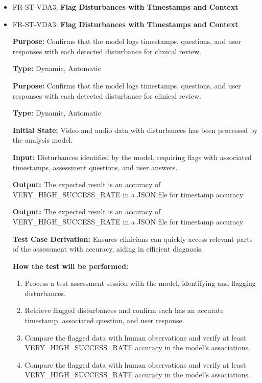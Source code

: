 \documentclass[12pt, titlepage]{article}
\begin{document}
\begin{itemize}
  \item FR-ST-VDA3: \textbf{Flag Disturbances with Timestamps and Context}
  \item FR-ST-VDA3: \textbf{Flag Disturbances with Timestamps and Context}
  \begin{mdframed}[linewidth=0.5mm]
      \textbf{Purpose:} Confirms that the model logs timestamps, questions, and user responses with each detected disturbance for clinical review. \par
      \textbf{Type:} Dynamic, Automatic \par
      \textbf{Purpose:} Confirms that the model logs timestamps, questions, and user responses with each detected disturbance for clinical review. \par
      \textbf{Type:} Dynamic, Automatic \par
      \textbf{Initial State:} Video and audio data with disturbances has been processed by the analysis model. \par
      \textbf{Input:} Disturbances identified by the model, requiring flags with associated timestamps, assessment questions, and user answers. \par
      \textbf{Output:} The expected result is an accuracy of VERY\_HIGH\_SUCCESS\_RATE in a JSON file for timestamp accuracy \par
      \textbf{Output:} The expected result is an accuracy of VERY\_HIGH\_SUCCESS\_RATE in a JSON file for timestamp accuracy \par
      \textbf{Test Case Derivation:} Ensures clinicians can quickly access relevant parts of the assessment with accuracy, aiding in efficient diagnosis. \par
      \textbf{How the test will be performed:}
      \begin{enumerate}[noitemsep]
        \item Process a test assessment session with the model, identifying and flagging disturbances.
        \item Retrieve flagged disturbances and confirm each has an accurate timestamp, associated question, and user response.
        \item Compare the flagged data with human observations and verify at least \\ VERY\_HIGH\_SUCCESS\_RATE accuracy in the model’s associations.
        \item Compare the flagged data with human observations and verify at least \\ VERY\_HIGH\_SUCCESS\_RATE accuracy in the model’s associations.
      \end{enumerate}
  \end{mdframed}
\end{itemize}
\end{document}
